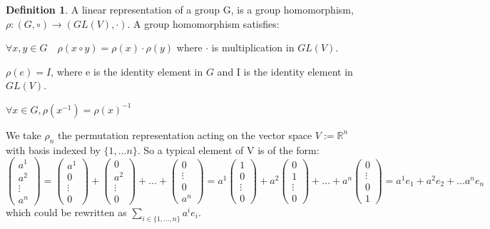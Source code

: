 \documentclass{article}
\theoremstyle{definition}
\newtheorem{definition}{Definition}
\begin{document}
\begin{definition} A linear representation of a group G, is a group homomorphism, $\rho : (G,\circ) \rightarrow (GL(V),\cdot)$. A group homomorphism satisfies:
\item \(\forall x,y \in G \quad \rho(x\circ y) = \rho(x) \cdot \rho(y) \) where $\cdot $ is multiplication in $GL(V)$.
\item \( \rho(e) = I \), where e is the identity element in $G$ and I is the identity element in $ GL(V) $.
\item \( \forall x \in G, \rho(x^{-1}) = \rho(x)^{-1}\)
\end{definition}
We take $\rho_n $ the permutation representation acting on the vector space $V := \mathbb{R}^n$ with basis indexed by $ \{1, \dots n\} $. So a typical element of V is of the form: 
\[ \begin{pmatrix} a^1 \\ a^2 \\ \vdots \\ a^n \end{pmatrix} = \begin{pmatrix} a^1 \\ 0 \\ \vdots \\ 0 \end{pmatrix} + \begin{pmatrix} 0 \\ a^2 \\ \vdots \\ 0 \end{pmatrix} + \dots + \begin{pmatrix} 0 \\  \vdots \\ 0\\ a^n \end{pmatrix} = a^1\begin{pmatrix} 1 \\ 0 \\ \vdots \\ 0 \end{pmatrix} + a^2\begin{pmatrix} 0 \\ 1 \\ \vdots \\ 0 \end{pmatrix} + \dots + a^n\begin{pmatrix} 0 \\  \vdots \\ 0\\ 1\end{pmatrix} = a^1 e_1 + a^2 e_2 + \dots a^n e_n \]which could be rewritten as $\sum_{i \in \{1,\dots,n\} } a^i e_i$. 
\end{document}

